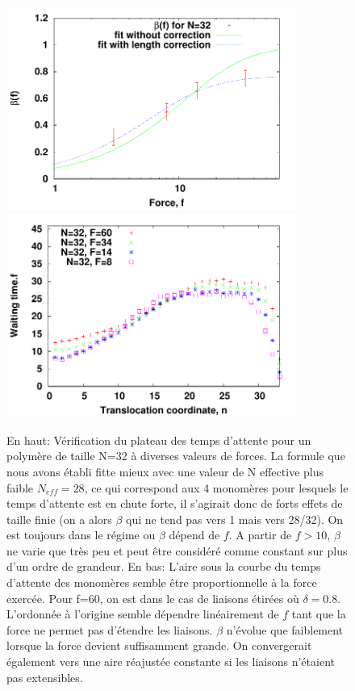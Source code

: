 \begin{figure}[H]
\begin{center}
\includegraphics[width=0.85\textwidth]{betaf.pdf}
\includegraphics[width=0.85\textwidth]{waitingtimen32foisf.pdf}


\caption[Plateau des temps d'attente et comportement en fonction de la force]{En haut: Vérification du plateau des temps d'attente pour un polymère de taille N=32 à diverses valeurs de forces. La formule que nous avons établi fitte mieux avec une valeur de N effective plus faible $N_{eff} =28$, ce qui correspond aux 4 monomères pour lesquels le temps d'attente est en chute forte, il s'agirait donc de forts effets de taille finie (on a alors $\beta$ qui ne tend pas vers 1 mais vers 28/32). On est toujours dans le régime ou $\beta$ dépend de $f$. A partir de $f>10$, $\beta$ ne varie que très peu et peut être considéré comme constant sur plus d'un ordre de grandeur. En bas: L'aire sous la courbe du temps d'attente des monomères semble être proportionnelle à la force exercée. Pour f=60, on est dans le cas de liaisons étirées où $\delta=0.8$. L'ordonnée à l'origine semble dépendre linéairement de $f$ tant que la force ne permet pas d'étendre les liaisons. $\beta$ n'évolue que faiblement lorsque la force devient suffisamment grande. On convergerait également vers une aire réajustée constante si les liaisons n'étaient pas extensibles.}
\label{verifbetawaitingtimesamen}
\end{center}
\end{figure}



